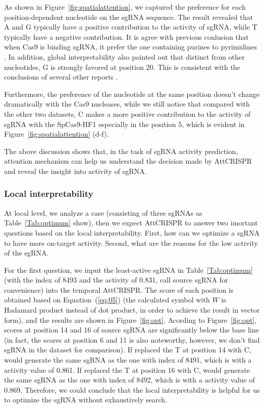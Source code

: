 \documentclass{bioinfo}
\begin{document}
As shown in Figure~\ref{fig:spatialattention}, we captured the preference for each position-dependent nucleotide on the sgRNA sequence. 
The result revealed that A and G typically have a positive contribution to the activity of sgRNA, while T typically have a negative contribution. 
It is agree with previous conlusion that when Cas9 is binding sgRNA, it prefer the one containing purines to pyrimidines \citep{wang2014genetic}. 
In addition, global interpretability also pointed out that distinct from other nucleotides, G is strongly favored at position 20. 
This is consistent with the conclusions of several other reports \citep{Wong2015,Doench2014}.

Furthermore, the preference of the nucleotide at the same position doesn't change dramatically with the Cas9 nucleases, 
while we still notice that compared with the other two datasets, 
C makes a more positive contribution to the activity of sgRNA with the SpCas9-HF1 especially in the position 5, which is evident in Figure~\ref{fig:spatialattention} (d-f). 

The above discussion shows that, in the task of sgRNA activity prediction, 
attention mechanism can help us understand the decision made by AttCRISPR and reveal the insight into activity of sgRNA. 

\subsubsection{Local interpretability}\label{section:local}

At local level, we analyze a case (consisting of three sgRNAs as Table~\ref{Tab:optimum} show), 
then we expect AttCRISPR to answer two imortant questions based on the local interpretability. 
First, how can we optimize a sgRNA to have more on-target activity. 
Second, what are the reasons for the low activity of the sgRNA. 

For the first question, we input the least-active sgRNA in Table~\ref{Tab:optimum} (with the index of 8493 and the activity of 0.831, call source sgRNA for convenience) into the temporal AttCRISPR. 
The score of each position is obtained based on Equation~(\ref{eq:05}) (the calculated symbol with $W$ is Hadamard product instead of dot product, in order to achieve the result in vector form), 
and the results are shown in Figure~\ref{fig:opt}. 
Acording to Figure~\ref{fig:opt}, scores at position 14 and 16 of source sgRNA are significantly below the base line 
(in fact, the scores at position 6 and 11 is also noteworthy, however, we don't find sgRNA in the dataset for comparison). 
If replaced the T at position 14 with C, would generate the same sgRNA as the one with index of 8491, which is with a activity value of 0.861. 
If replaced the T at position 16 with C, would generate the same sgRNA as the one with index of 8492, which is with a activity value of 0.869. 
Therefore, we could conclude that the local interpretability is helpful for us to optimize the sgRNA without exhaustively search.
\end{document}
